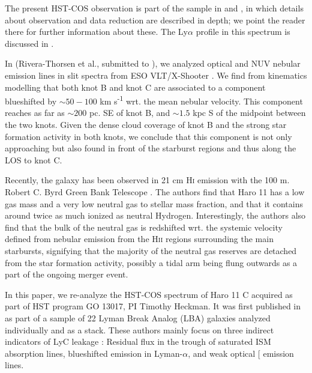 \documentclass[twocolumn]{aastex61}
\begin{document}
The present HST-COS observation is part of the sample in
\citet{Heckman2015} and \citet{Alexandroff2015}, in which details about
observation and data reduction are described in depth; we point the
reader there for further information about these. The Ly$\alpha$ profile
in this spectrum is discussed in \citet{JaskotOey}.

In (Rivera-Thorsen et al., submitted to \apj), we analyzed optical and
NUV nebular emission lines in slit spectra from ESO VLT/X-Shooter
\citep[see also][]{Guseva2012}. We find from kinematics modelling that
both knot B and knot C are associated to a component blueshifted by
$\sim 50 - 100$ km s\textsuperscript{-1} wrt. the mean nebular velocity.
This component reaches as far as $\sim 200$ pc. SE of knot B, and
$\sim 1.5$ kpc S of the midpoint between the two knots. Given the dense
cloud coverage of knot B and the strong star formation activity in both
knots, we conclude that this component is not only approaching but also
found in front of the starburst regions and thus along the LOS to knot
C.

Recently, the galaxy has been observed in 21 cm H\textsc{i} emission
with the 100 m. Robert C. Byrd Green Bank Telescope
\citep{Pardy2016arXiv}. The authors find that Haro 11 has a low gas mass
and a very low neutral gas to stellar mass fraction, and that it
contains around twice as much ionized as neutral Hydrogen.
Interestingly, the authors also find that the bulk of the neutral gas is
redshifted wrt. the systemic velocity defined from nebular emission from
the H\textsc{ii} regions surrounding the main starbursts, signifying
that the majority of the neutral gas reserves are detached from the star
formation activity, possibly a tidal arm being flung outwards as a part
of the ongoing merger event.

In this paper, we re-analyze the HST-COS spectrum of Haro 11 C acquired
as part of HST program GO 13017, PI Timothy Heckman. It was first
published in \citet{Alexandroff2015} as part of a sample of 22 Lyman
Break Analog (LBA) galaxies analyzed individually and as a stack. These
authors mainly focus on three indirect indicators of LyC leakage
\citep{Overzier2009, Heckman2011}: Residual flux in the trough of
saturated ISM absorption lines, blueshifted emission in Lyman-$\alpha$,
and weak optical {[}\ion{S}{2}{]} emission lines.
\end{document}
